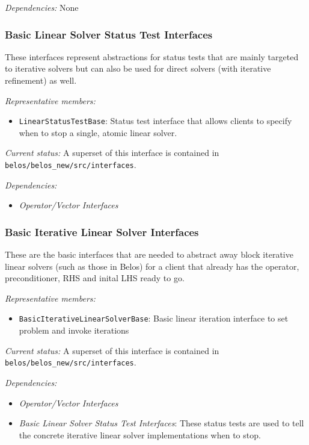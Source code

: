 \documentclass[pdf,ps2pdf,11pt]{SANDreport}
\begin{document}
{}\textit{Dependencies:} None

%
\subsubsection{Basic Linear Solver Status Test Interfaces}
%

These interfaces represent abstractions for status tests that are mainly
targeted to iterative solvers but can also be used for direct solvers (with
iterative refinement) as well.

{}\textit{Representative members:}
\begin{itemize}
%
{}\item {}\texttt{LinearStatusTestBase}: Status test interface that allows clients
to specify when to stop a single, atomic linear solver.
%
\end{itemize}

{}\textit{Current status:} A superset of this interface is contained in
{}\texttt{belos/belos\_new/src/interfaces}.

{}\textit{Dependencies:}
\begin{itemize}
\item {}\textit{Operator/Vector Interfaces}
\end{itemize}

%
\subsubsection{Basic Iterative Linear Solver Interfaces}
%

These are the basic interfaces that are needed to abstract away block
iterative linear solvers (such as those in Belos) for a client that already
has the operator, preconditioner, RHS and inital LHS ready to go.

{}\textit{Representative members:}
\begin{itemize}
%
{}\item {}\texttt{BasicIterativeLinearSolverBase}: Basic linear iteration
interface to set problem and invoke iterations
%
\end{itemize}

{}\textit{Current status:} A superset of this interface is contained in
{}\texttt{belos/belos\_new/src/interfaces}.

{}\textit{Dependencies:}
\begin{itemize}
%
{}\item {}\textit{Operator/Vector Interfaces}
%
{}\item {}\textit{Basic Linear Solver Status Test Interfaces}: These status
tests are used to tell the concrete iterative linear solver implementations
when to stop.
%
\end{itemize}
\end{document}
